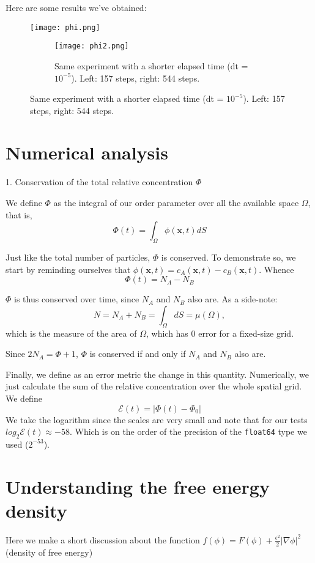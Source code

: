 \documentclass[11pt,a4paper]{report}
\begin{document}
Here are some results we've obtained:

\begin{figure}[h!]
\centering
\texttt{[image: phi.png]}
\caption{Binary fluid phase diagram after 14200 iterations (dt=$100$).}
\begin{subfigure}
\texttt{[image: phi22.png]}
\texttt{[image: phi2.png]}
\caption{Same experiment with a shorter elapsed time (dt = $10^{-5}$). Left: 157 steps, right: 544 steps.}
\end{subfigure}
\end{figure}

\section{Numerical analysis}

1. Conservation of the total relative concentration $\Phi$

We define $\Phi$ as the integral of our order parameter over all the available space $\Omega$, that is,
$$ \Phi(t) = \int_{\Omega} \phi(\textbf{x},t)dS $$

Just like the total number of particles, $\Phi$ is conserved.
To demonstrate so, we start by reminding ourselves that
$\phi(\textbf{x},t) = c_A(\textbf{x},t)-c_B(\textbf{x},t)$.
Whence
$$ \Phi(t) = N_A - N_B $$

$\Phi$ is thus conserved over time, since $N_A$ and $N_B$ also are.
As a side-note:
$$ N = N_A + N_B = \int_{\Omega} dS = \mu(\Omega), $$
which is the measure of the area of $\Omega$, which has 0 error for a fixed-size grid.

Since $2N_A = \Phi+1$, $\Phi$ is conserved if and only if $N_A$ and $N_B$ also are.

Finally, we define as an error metric the change in this quantity.
Numerically, we just calculate the sum of the relative concentration over the whole spatial grid.
We define
$$ \mathcal{E}(t) = |\Phi(t) - \Phi_0| $$
We take the logarithm since the scales are very small and note that for our tests $log_{2}\mathcal{E}(t) \approx -58$.
Which is on the order of the precision of the \verb`float64` type we used ($2^{-53}$).



\section{Understanding the free energy density}
Here we make a short discussion about the function
$f(\phi) = F(\phi) + \frac{\epsilon^2}{2}|\nabla{\phi}|^2$
(density of free energy)
\end{document}
